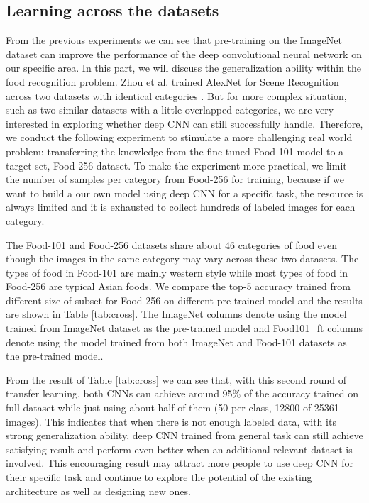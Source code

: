 \subsection{Learning across the datasets}
From the previous experiments we can see that pre-training on the ImageNet dataset can improve the performance of the deep convolutional neural network on our specific area. In this part, we will discuss the generalization ability within the food recognition problem.  Zhou et al. trained AlexNet for Scene Recognition across two datasets with identical categories \cite{NIPS2014_Zhou}. But for more complex situation, such as two similar datasets with a little overlapped categories, we are very interested in exploring whether deep CNN can still successfully handle. Therefore, we conduct the following experiment to stimulate a more challenging real world problem: transferring the knowledge from the fine-tuned Food-101 model to a target set, Food-256 dataset. To make the experiment more practical, we limit the number of samples per category from Food-256 for training, because if we want to build a our own model using deep CNN for a specific task, the resource is always limited and it is exhausted to collect hundreds of labeled images for each category.

The Food-101 and Food-256 datasets share about 46 categories of food even though the images in the same category may vary across these two datasets. The types of food in Food-101 are mainly western style while most types of food in Food-256 are typical Asian foods. We compare the top-5 accuracy trained from different size of subset for Food-256 on different pre-trained model and the results are shown in Table \ref{tab:cross}. 
The ImageNet columns denote using the model trained from ImageNet dataset as the pre-trained model and Food101\_ft columns denote using the model trained from both ImageNet and Food-101 datasets as the pre-trained model.

From the result of Table \ref{tab:cross} we can see that, with this second round of transfer learning, both CNNs can achieve around 95\% of the accuracy trained on full dataset while just using about half of them (50 per class, 12800 of 25361 images). This indicates that when there is not enough labeled data, with its strong generalization ability, deep CNN trained from general task can still achieve satisfying result and perform even better when an additional relevant dataset is involved. This encouraging result may attract more people to use deep CNN for their specific task and continue to explore the potential of the existing architecture as well as designing new ones.

